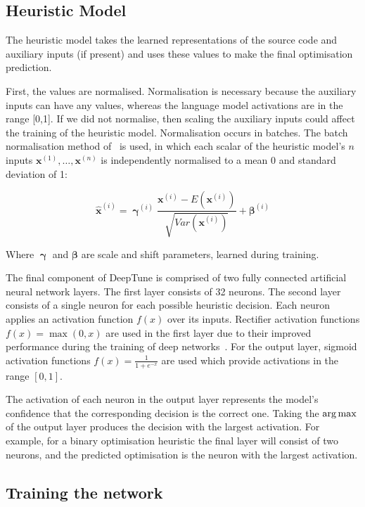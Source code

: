 \subsection{Heuristic Model}

The heuristic model takes the learned representations of the source code and auxiliary inputs (if present) and uses these values to make the final optimisation prediction.

First, the values are normalised. Normalisation is necessary because the auxiliary inputs can have any values, whereas the language model activations are in the range [0,1]. If we did not normalise, then scaling the auxiliary inputs could affect the training of the heuristic model. Normalisation occurs in batches. The batch normalisation method of~\cite{Ioffe2015a} is used, in which each scalar of the heuristic model's $n$ inputs $\bm{x}^{(1)}, \ldots, \bm{x}^{(n)}$ is independently normalised to a mean 0 and standard deviation of 1:

\begin{equation}
\bm{\hat{x}}^{(i)} = \bm{\upgamma}^{(i)} \frac{\bm{x}^{(i)} - E(\bm{x}^{(i)})}{\sqrt{Var(\bm{x}^{(i)})}} + \bm{\beta}^{(i)}
\end{equation}

Where $\bm{\upgamma}$ and $\bm{\beta}$ are scale and shift parameters, learned during training.

The final component of DeepTune is comprised of two fully connected artificial neural network layers. The first layer consists of 32 neurons. The second layer consists of a single neuron for each possible heuristic decision. Each neuron applies an activation function $f(x)$ over its inputs. Rectifier activation functions $f(x) = \max(0, x)$ are used in the first layer due to their improved performance during the training of deep networks~\cite{Nair2010}. For the output layer, sigmoid activation functions $f(x) = \frac{1}{1+e^{-x}}$ are used which provide activations in the range $[0,1]$.

The activation of each neuron in the output layer represents the model's confidence that the corresponding decision is the correct one. Taking the $\operatorname*{arg\,max}$ of the output layer produces the decision with the largest activation. For example, for a binary optimisation heuristic the final layer will consist of two neurons, and the predicted optimisation is the neuron with the largest activation.


\subsection{Training the network}

